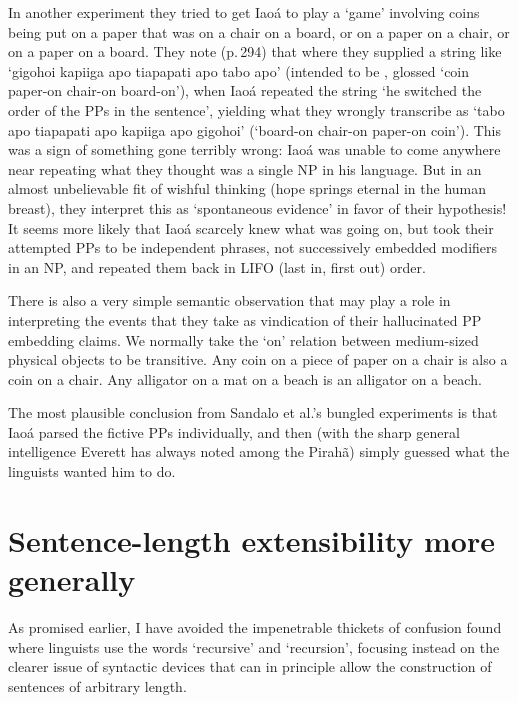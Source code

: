 \documentclass[output=paper,colorlinks,citecolor=brown
]{langscibook}
\begin{document}
In another experiment they tried to get Iao{\'a} to play a `game'
involving coins being put on a paper that was on a chair on a board,
or on a paper on a chair, or on a paper on a board. They note (p.\,294)
that where they supplied a string like `gigohoi kapiiga apo tiapapati
apo tabo apo' (intended to be , glossed `coin paper-on chair-on board-on'),
when Iao{\'a} repeated the string `he switched the order of the PPs in
the sentence', yielding what they wrongly transcribe as `tabo apo
tiapapati apo kapiiga apo gigohoi' (`board-on chair-on paper-on coin').
This was a sign of something gone terribly wrong: Iao{\'a} was unable
to come anywhere near repeating what they thought was a single NP in
his language. But in an almost unbelievable fit of wishful thinking
(hope springs eternal in the human breast), they interpret this as
`spontaneous evidence' in favor of their hypothesis!
It seems more likely that Iao{\'a} scarcely knew what was going on,
but took their attempted PPs to be independent phrases, not
successively embedded modifiers in an NP, and repeated them back in
LIFO (last in, first out) order.

There is also a very simple semantic observation that may play a
role in interpreting the events that they take as vindication of their
hallucinated PP embedding claims. We normally take the `on' relation
between medium-sized physical objects to be transitive. Any coin on
a piece of paper on a chair is also a coin on a chair. Any alligator
on a mat on a beach is an alligator on a beach.

The most plausible conclusion from Sandalo et al.'s bungled experiments
is that Iao{\'a} parsed the fictive PPs individually, and then (with the
sharp general intelligence Everett has always noted among the Pirah{\~a})
simply guessed what the linguists wanted him to do.

\section{Sentence-length extensibility more generally}

As promised earlier, I have avoided the impenetrable thickets of confusion
found where linguists use the words `recursive' and `recursion', focusing
instead on the clearer issue of syntactic devices that can in principle
allow the construction of sentences of arbitrary length.
\end{document}
